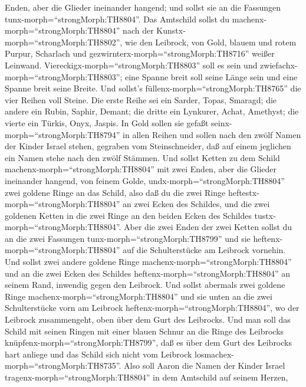 Enden, aber die Glieder ineinander hangend; und sollst sie an die
Fassungen tunx-morph=``strongMorph:TH8804''.  Das Amtschild
sollst du machenx-morph=``strongMorph:TH8804'' nach der
Kunstx-morph=``strongMorph:TH8802'', wie den Leibrock, von Gold, blauem
und rotem Purpur, Scharlach und gezwirnterx-morph=``strongMorph:TH8716''
weißer Leinwand.  Viereckigx-morph=``strongMorph:TH8803''
soll es sein und zwiefachx-morph=``strongMorph:TH8803''; eine Spanne
breit soll seine Länge sein und eine Spanne breit seine Breite.
 Und sollst's füllenx-morph=``strongMorph:TH8765'' die vier
Reihen voll Steine. Die erste Reihe sei ein Sarder, Topas, Smaragd;
 die andere ein Rubin, Saphir, Demant;  die
dritte ein Lynkurer, Achat, Amethyst;  die vierte ein
Türkis, Onyx, Jaspis. In Gold sollen sie gefaßt
seinx-morph=``strongMorph:TH8794'' in allen Reihen  und
sollen nach den zwölf Namen der Kinder Israel stehen, gegraben vom
Steinschneider, daß auf einem jeglichen ein Namen stehe nach den zwölf
Stämmen.  Und sollst Ketten zu dem Schild
machenx-morph=``strongMorph:TH8804'' mit zwei Enden, aber die Glieder
ineinander hangend, von feinem Golde, 
undx-morph=``strongMorph:TH8804'' zwei goldene Ringe an das Schild, also
daß du die zwei Ringe heftestx-morph=``strongMorph:TH8804'' an zwei
Ecken des Schildes,  und die zwei goldenen Ketten in die
zwei Ringe an den beiden Ecken des Schildes
tustx-morph=``strongMorph:TH8804''.  Aber die zwei Enden
der zwei Ketten sollst du an die zwei Fassungen
tunx-morph=``strongMorph:TH8799'' und sie
heftenx-morph=``strongMorph:TH8804'' auf die Schulterstücke am Leibrock
vornehin.  Und sollst zwei andere goldene Ringe
machenx-morph=``strongMorph:TH8804'' und an die zwei Ecken des Schildes
heftenx-morph=``strongMorph:TH8804'' an seinem Rand, inwendig gegen den
Leibrock.  Und sollst abermals zwei goldene Ringe
machenx-morph=``strongMorph:TH8804'' und sie unten an die zwei
Schulterstücke vorn am Leibrock heftenx-morph=``strongMorph:TH8804'', wo
der Leibrock zusammengeht, oben über dem Gurt des Leibrocks.
 Und man soll das Schild mit seinen Ringen mit einer blauen
Schnur an die Ringe des Leibrocks knüpfenx-morph=``strongMorph:TH8799'',
daß es über dem Gurt des Leibrocks hart anliege und das Schild sich
nicht vom Leibrock losmachex-morph=``strongMorph:TH8735''. 
Also soll Aaron die Namen der Kinder Israel
tragenx-morph=``strongMorph:TH8804'' in dem Amtschild auf seinem Herzen,

